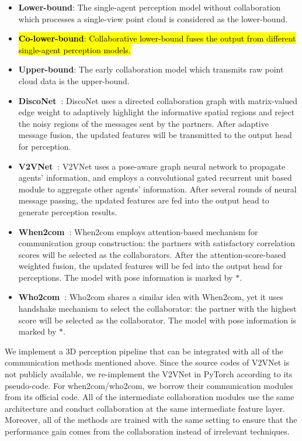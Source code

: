 \begin{itemize}
    \item \textbf{Lower-bound}: The single-agent perception model without collaboration which processes a single-view point cloud is considered as the lower-bound. 
    
    \item \hl{\textbf{Co-lower-bound}: Collaborative lower-bound fuses the output from different single-agent perception models. }
    
    \item \textbf{Upper-bound}: The early collaboration model which transmits raw point cloud data is the upper-bound.
     \item \textbf{DiscoNet~\cite{Li_2021_NeurIPS}}: DiscoNet uses a directed collaboration graph with matrix-valued edge weight to adaptively highlight the informative spatial regions and reject the noisy regions of the messages sent by the partners. After adaptive message fusion, the updated features will be transmitted to the output head for perception. 
    \item \textbf{V2VNet~\cite{Wang2020V2VNetVC}}: V2VNet uses a pose-aware graph neural network to propagate agents’ information, and employs a convolutional gated recurrent unit based module to aggregate other agents’ information. After several rounds of neural message passing, the updated features are fed into the output head to generate perception results.
    \item \textbf{When2com~\cite{Liu2020When2comMP}}: When2com employs attention-based mechanism for communication group construction: the partners with satisfactory correlation scores will be selected as the collaborators. After the attention-score-based weighted fusion, the updated features will be fed into the output head for perceptions. The model with pose information is marked by $*$.
    \item \textbf{Who2com~\cite{Liu2020Who2comCP}}: Who2com shares a similar idea with When2com, yet it uses handshake mechanism to select the collaborator: the partner with the highest score will be selected as the collaborator. The model with pose information is marked by $*$.
\end{itemize}

We implement a 3D perception pipeline that can be integrated with all of the communication methods mentioned above. Since the source codes of V2VNet is not publicly available, we re-implement the V2VNet in PyTorch according to its pseudo-code. For when2com/who2com, we borrow their communication modules from its official code. All of the intermediate collaboration modules use the same architecture and conduct collaboration at the same intermediate feature layer. Moreover, all of the methods are trained with the same setting to ensure that the performance gain comes from the collaboration instead of irrelevant techniques. 

